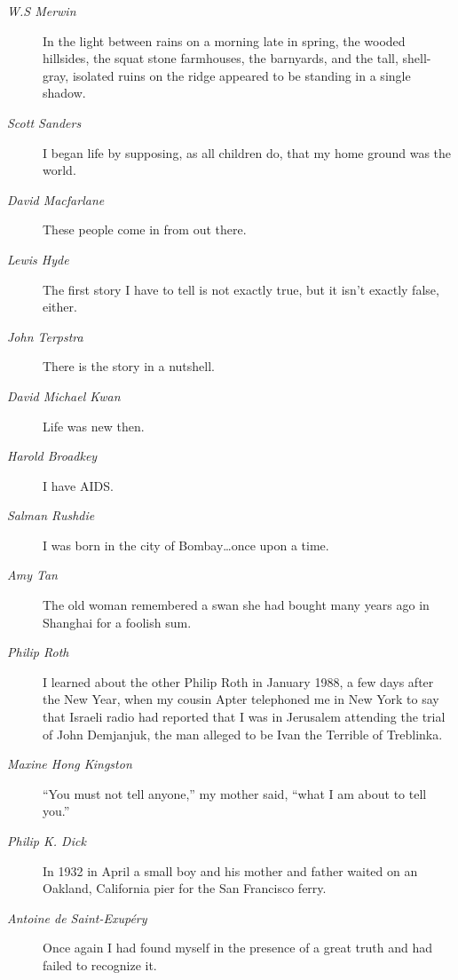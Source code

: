 \documentclass[letterpaper,oneside]{memoir}
\begin{document}
\begin{description}
\begin{description}
\item [\textit{W.S Merwin}] In the light between rains on a morning late in spring, the wooded hillsides, the squat stone farmhouses, the barnyards, and the tall, shell-gray, isolated ruins on the ridge appeared to be standing in a single shadow.

\item [\textit{Scott Sanders}] I began life by supposing, as all children do, that my home ground was the world.

\item [\textit{David Macfarlane}] These people come in from out there.

\item [\textit{Lewis Hyde}] The first story I have to tell is not exactly true, but it isn't exactly false, either.

\item [\textit{John Terpstra}] There is the story in a nutshell.

\item [\textit{David Michael Kwan}] Life was new then.

\item [\textit{Harold Broadkey}] I have \textsc{AIDS}.
\item [\textit{Salman Rushdie}] I was born in the city of Bombay\ldots once upon a time.

\item [\textit{Amy Tan}] The old woman remembered a swan she had bought many years ago in Shanghai for a foolish sum.

\item [\textit{Philip Roth}] I learned about the other Philip Roth in January 1988, a few days after the New Year, when my cousin Apter telephoned me in New York to say that Israeli radio had reported that I was in Jerusalem attending the trial of John Demjanjuk, the man alleged to be Ivan the Terrible of Treblinka.

\item [\textit{Maxine Hong Kingston}] ``You must not tell anyone,'' my mother said, ``what I am about to tell you.''

\item [\textit{Philip K. Dick}] In 1932 in April a small boy and his mother and father waited on an Oakland, California pier for the San Francisco ferry.

\item [\textit{Antoine de Saint-Exup\'ery}] Once again I had found myself in the presence of a great truth and had failed to recognize it.


\end{description}
\end{description}
\end{document}
